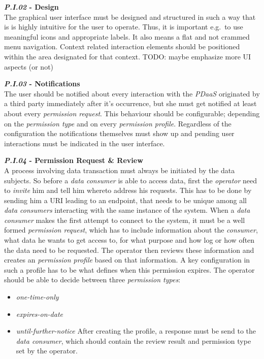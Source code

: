 \documentclass[12pt,english,a4paper,titlepage,cleardoublepage=empty,dottedtoc]{report}
\providecommand{\tightlist}{%
  \setlength{\itemsep}{0pt}\setlength{\parskip}{0pt}}
\begin{document}
\textbf{\emph{\protect\hypertarget{pi02}{}{P.I.02}} - Design}\\
The graphical user interface must be designed and structured in such a
way that is is highly intuitive for the user to operate. Thus, it is
important e.g.~to use meaningful icons and appropriate labels. It also
means a flat and not crammed menu navigation. Context related
interaction elements should be positioned within the area designated for
that context. TODO: maybe emphasize more UI aspects (or not)

\textbf{\emph{\protect\hypertarget{pi03}{}{P.I.03}} - Notifications}\\
The user should be notified about every interaction with the
\emph{PDaaS} originated by a third party immediately after it's
occurrence, but she must get notified at least about every
\emph{permission request}. This behaviour should be configurable;
depending on the \emph{permission type} and on every \emph{permission
profile}. Regardless of the configuration the notifications themselves
must show up and pending user interactions must be indicated in the user
interface.

\textbf{\emph{\protect\hypertarget{pi04}{}{P.I.04}} - Permission Request
\& Review}\\
A process involving data transaction must always be initiated by the
data subjects. So before a \emph{data consumer} is able to access data,
first the \emph{operator} need to \emph{invite} him and tell him whereto
address his requests. This has to be done by sending him a URI leading
to an endpoint, that needs to be unique among all \emph{data consumers}
interacting with the same instance of the system. When a \emph{data
consumer} makes the first attempt to connect to the system, it must be a
well formed \emph{permission request}, which has to include information
about the \emph{consumer}, what data he wants to get access to, for what
purpose and how log or how often the data need to be requested. The
operator then reviews these information and creates an \emph{permission
profile} based on that information. A key configuration in such a
profile has to be what defines when this permission expires. The
operator should be able to decide between three \emph{permission types}:

\begin{itemize}
\tightlist
\item
  \emph{one-time-only}
\item
  \emph{expires-on-date}
\item
  \emph{until-further-notice} After creating the profile, a response
  must be send to the \emph{data consumer}, which should contain the
  review result and permission type set by the operator.
\end{itemize}
\end{document}

